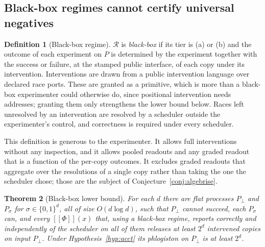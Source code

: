 \documentclass[11pt]{article}
\theoremstyle{definition}
\newtheorem{definition}{Definition}[section]
\theoremstyle{plain}
\newtheorem{theorem}[definition]{Theorem}
\theoremstyle{remark}
\newcommand{\enc}[1]{[\![#1]\!]}
\newcommand{\Reg}{\mathcal{R}}
\begin{document}
\subsection{Black-box regimes cannot certify universal negatives}

\begin{definition}[Black-box regime]\label{def:blackbox}
$\Reg$ is \emph{black-box} if its tier is (a) or (b) and the outcome of
each experiment on $P$ is determined by the experiment together with the
success or failure, at the stamped public interface, of each copy under
its intervention. Interventions are drawn from a public intervention
language over declared race ports. These are granted as a primitive,
which is more than a black-box experimenter could otherwise do, since
positional intervention needs addresses; granting them only strengthens
the lower bound below. Races left unresolved by an
intervention are resolved by a scheduler outside the experimenter's
control, and correctness is required under every scheduler.
\end{definition}

This definition is generous to the experimenter. It allows full
interventions without any inspection, and it allows pooled readouts and
any graded readout that is a function of the per-copy outcomes. It
excludes graded readouts that aggregate over the resolutions of a single
copy rather than taking the one the scheduler chose; those are the
subject of Conjecture~\ref{conj:algebrise}.

\begin{theorem}[Black-box lower bound]\label{thm:blackbox}
For each $d$ there are flat processes $P_\bot$ and $P_\sigma$ for
$\sigma \in \{0,1\}^d$, all of size $O(d \log d)$, such that $P_\bot$ cannot
succeed, each $P_\sigma$ can, and every $\enc{\Phi}(x)$ that, using a
black-box regime, reports correctly and independently of the scheduler
on all of them releases at least $2^d$ intervened copies on input
$P_\bot$. Under Hypothesis~\ref{hyp:acct} its phlogiston on $P_\bot$ is
at least $2^d$.
\end{theorem}
\end{document}
